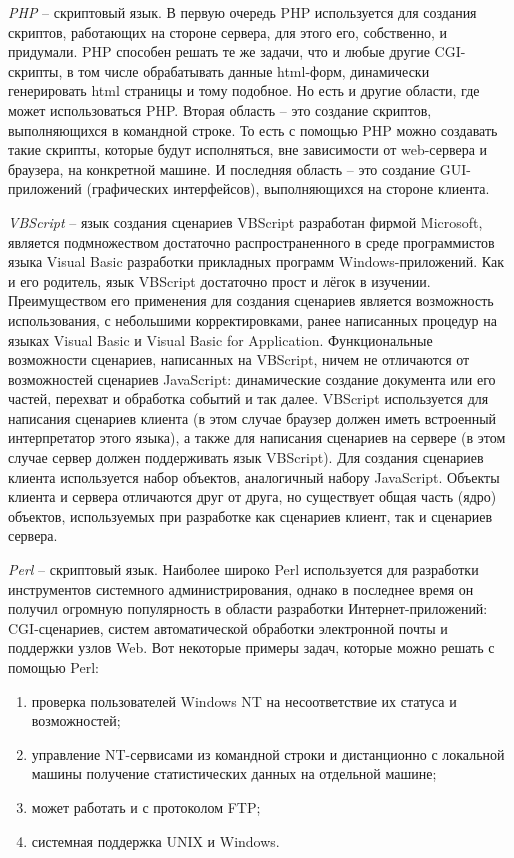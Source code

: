 {\itshape PHP } -- скриптовый язык. В первую очередь PHP используется для создания скриптов, работающих на стороне сервера, для этого его, собственно, и придумали. PHP способен решать те же задачи, что и любые другие CGI-скрипты, в том числе обрабатывать данные html-форм, динамически генерировать html страницы и тому подобное. Но есть и другие области, где может использоваться PHP.
Вторая область – это создание скриптов, выполняющихся в командной строке. То есть с помощью PHP можно создавать такие скрипты, которые будут исполняться, вне зависимости от web-сервера и браузера, на конкретной машине.
И последняя область – это создание GUI-приложений (графических интерфейсов), выполняющихся на стороне клиента\cite{php}.

{\itshape VBScript} -- язык создания сценариев VBScript разработан фирмой Microsoft, является подмножеством достаточно распространенного в среде программистов языка Visual Basic разработки прикладных программ Windows-приложений. Как и его родитель, язык VBScript достаточно прост и лёгок в изучении.
Преимуществом его применения для создания сценариев является возможность использования, с небольшими корректировками, ранее написанных процедур на языках Visual Basic и Visual Basic for Application.
Функциональные возможности сценариев, написанных на VBScript, ничем не отличаются от возможностей сценариев JavaScript: динамические создание документа или его частей, перехват и обработка событий и так далее.
VBScript используется для написания сценариев клиента (в этом случае браузер должен иметь встроенный интерпретатор этого языка), а также для написания сценариев на сервере (в этом случае сервер должен поддерживать язык VBScript).
Для создания сценариев клиента используется набор объектов, аналогичный набору JavaScript. Объекты клиента и сервера отличаются друг от друга, но существует общая часть (ядро) объектов, используемых при разработке как сценариев клиент, так и сценариев сервера\cite{VBS}.

{\itshape Perl} -- скриптовый язык. Наиболее широко Perl используется для разработки инструментов системного администрирования, однако в последнее время он получил огромную популярность в области разработки Интернет-приложений: CGI-сценариев, систем автоматической обработки электронной почты и поддержки узлов Web\cite{perl}.
Вот некоторые примеры задач, которые можно решать с помощью Perl:
\begin{enumerate}
\item проверка пользователей Windows NT на несоответствие их статуса и возможностей;
\item управление NT-сервисами из командной строки и дистанционно с локальной машины получение статистических данных на отдельной машине;
\item может работать и с протоколом FTP;
\item системная поддержка UNIX и Windows.
\end{enumerate}

